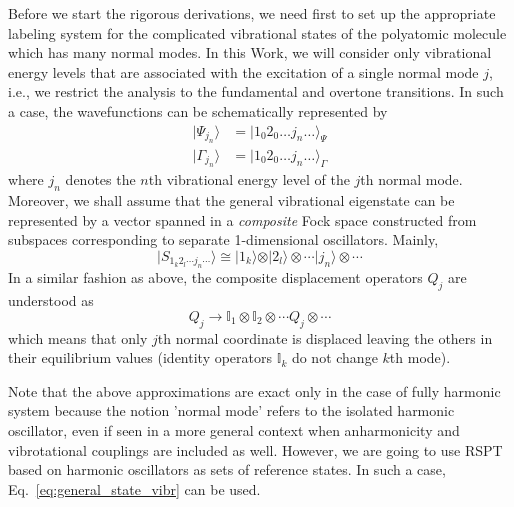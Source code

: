 \documentclass[a4paper,titlepage,twoside,fleqn,12pt]{book}
\begin{document}
\begin{refsection}
Before we start the rigorous derivations, we need first to set up the appropriate labeling system
for the complicated vibrational states of the polyatomic molecule which has many normal modes.
In this Work, we will consider only vibrational energy levels that are associated with
the excitation of a single normal mode $j$, i.e., we restrict the analysis to the fundamental
and overtone transitions. In such a case, the 
wavefunctions can be schematically represented by
%
\begin{eqnarray}
\vert \Psi_{j_n}   \rangle &= \vert 1_0 2_0 \ldots j_n \ldots \rangle_{\Psi} \\
\vert \Gamma_{j_n} \rangle &= \vert 1_0 2_0 \ldots j_n \ldots \rangle_{\Gamma} 
\end{eqnarray}
%
where $j_n$ denotes the $n$th vibrational energy level of the $j$th normal mode.
Moreover, we shall assume that the general vibrational eigenstate can be represented by a vector spanned
in a \emph{composite} Fock space constructed from subspaces corresponding 
to separate 1-dimensional oscillators. Mainly,
%
\begin{equation}  \label{eq:general_state_vibr}
\vert S_{1_k2_l\cdots j_n\cdots}   \rangle 
 \cong \vert 1_k \rangle \otimes \vert 2_l \rangle \otimes \cdots \vert j_n \rangle \otimes \cdots 
\end{equation}
%
In a similar fashion as above, the composite displacement operators $Q_j$
are understood as
%
\begin{equation}
Q_j \rightarrow \mathbb{I}_1 \otimes \mathbb{I}_2 \otimes \cdots Q_j \otimes \cdots
\end{equation}
%
which means that only $j$th normal coordinate is displaced leaving the others
in their equilibrium values (identity operators $\mathbb{I}_k$ do not change $k$th mode).

Note that the above approximations are exact only in the case of 
fully harmonic system because the notion 'normal mode' refers to
the isolated harmonic oscillator, even if seen in a more general context
when anharmonicity and vibrotational couplings are included as well.
However, we are going to use RSPT based on harmonic oscillators as 
sets of reference states. In such a case, Eq.~\eqref{eq:general_state_vibr} 
can be used.


\end{refsection}
\end{document}
